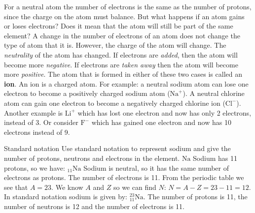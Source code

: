 \label{m38745*eip-950} 
      \noindent 
\label{m38745*eip-222}For a neutral atom the number of electrons is the same as the number of protons, since the charge on the atom must balance. But what happens if an atom gains or loses electrons? Does it mean that the atom will still be part of the same element? A change in the number of electrons of an atom does not change the type of atom that it is. However, the charge of the atom will change. The \textsl{neutrality} of the atom has changed. If electrons are \textsl{added}, then the atom will become more \textsl{negative}. If electrons are \textsl{taken away} then the atom will become more \textsl{positive}. The atom that is formed in either of these two cases is called an \textbf{ion}. An ion is a charged atom. For example: a neutral sodium atom can lose one electron to become a positively charged sodium atom ($\text{Na}^{+}$). A neutral chlorine atom can gain one electron to become a negatively charged chlorine ion ($\text{Cl}^{-}$). Another example is $\text{Li}^{+}$ which has lost one electron and now has only 2 electrons, instead of 3. Or consider $\text{F}^{-}$ which has gained one electron and now has 10 electrons instead of 9.   
\begin{wex}
{%
Standard notation
}
{%
Use standard notation to represent sodium and give the number of protons, neutrons and electrons in the element.
}
{%
 $\text{Na}$
 Sodium has 11 protons, so we have: ${}_{11}\text{Na}$
 Sodium is neutral, so it has the same number of electrons as protons. The number of electrons is 11.
 From the periodic table we see that $A=23$.
 We know $A$ and $Z$ so we can find $N$: $N = A - Z = 23 - 11 = 12$.
 In standard notation sodium is given by: $_{11}^{23}\text{Na}$. The number of protons is 11, the number of neutrons is 12 and the number of electrons is 11.
}    
\end{wex}
    

